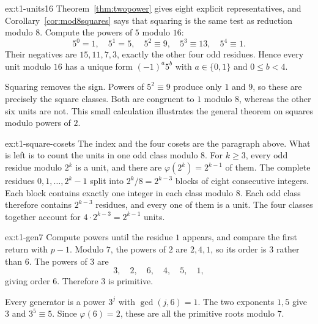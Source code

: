 \begin{solution}{ex:t1-units16}
\idea Theorem~\ref{thm:twopower} gives eight explicit representatives, and Corollary~\ref{cor:mod8squares} says that squaring is the same test as reduction modulo $8$.
\writeup Compute the powers of $5$ modulo $16$:
\[
5^0=1,\quad5^1=5,\quad5^2\equiv9,\quad5^3\equiv13,\quad5^4\equiv1.
\]
Their negatives are $15,11,7,3$, exactly the other four odd residues. Hence every unit modulo $16$ has a unique form $(-1)^a5^b$ with $a\in\{0,1\}$ and $0\le b<4$.

Squaring removes the sign. Powers of $5^2\equiv9$ produce only $1$ and $9$, so these are precisely the square classes. Both are congruent to $1$ modulo $8$, whereas the other six units are not. This small calculation illustrates the general theorem on squares modulo powers of $2$.
\end{solution}

\begin{solution}{ex:t1-square-cosets}
\idea The index and the four cosets are the paragraph above. What is left is to count the units in one odd class modulo $8$.
\writeup For $k\ge3$, every odd residue modulo $2^k$ is a unit, and there are $\varphi(2^k)=2^{k-1}$ of them. The complete residues $0,1,\ldots,2^k-1$ split into $2^k/8=2^{k-3}$ blocks of eight consecutive integers. Each block contains exactly one integer in each class modulo $8$. Each odd class therefore contains $2^{k-3}$ residues, and every one of them is a unit. The four classes together account for $4\cdot2^{k-3}=2^{k-1}$ units.
\end{solution}

\begin{solution}{ex:t1-gen7}
\idea Compute powers until the residue $1$ appears, and compare the first return with $p-1$.
\writeup Modulo $7$, the powers of $2$ are $2,4,1$, so its order is $3$ rather than $6$. The powers of $3$ are
\[
3,\quad2,\quad6,\quad4,\quad5,\quad1,
\]
giving order $6$. Therefore $3$ is primitive.

Every generator is a power $3^j$ with $\gcd(j,6)=1$. The two exponents $1,5$ give $3$ and $3^5\equiv5$. Since $\varphi(6)=2$, these are all the primitive roots modulo $7$.
\end{solution}


